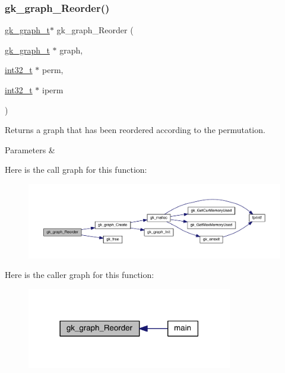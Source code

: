 \subsubsection{\texorpdfstring{gk\+\_\+graph\+\_\+\+Reorder()}{gk\_graph\_Reorder()}}
{\footnotesize\ttfamily \hyperlink{a00638}{gk\+\_\+graph\+\_\+t}$\ast$ gk\+\_\+graph\+\_\+\+Reorder (\begin{DoxyParamCaption}\item[{\hyperlink{a00638}{gk\+\_\+graph\+\_\+t} $\ast$}]{graph,  }\item[{\hyperlink{a00119_a37994e3b11c72957c6f454c6ec96d43d}{int32\+\_\+t} $\ast$}]{perm,  }\item[{\hyperlink{a00119_a37994e3b11c72957c6f454c6ec96d43d}{int32\+\_\+t} $\ast$}]{iperm }\end{DoxyParamCaption})}

Returns a graph that has been reordered according to the permutation. 
\begin{DoxyParams}{Parameters}
{\em } & \\
\hline
\end{DoxyParams}
Here is the call graph for this function\+:\nopagebreak
\begin{figure}[H]
\begin{center}
\leavevmode
\includegraphics[width=350pt]{a00846_aab929d2134ffb92863867c93a0ce1f27_cgraph}
\end{center}
\end{figure}
Here is the caller graph for this function\+:\nopagebreak
\begin{figure}[H]
\begin{center}
\leavevmode
\includegraphics[width=254pt]{a00846_aab929d2134ffb92863867c93a0ce1f27_icgraph}
\end{center}
\end{figure}
\mbox{\label{a00846_a4726366ef9bb2ef6a202d0fae0b60b3f}} 
